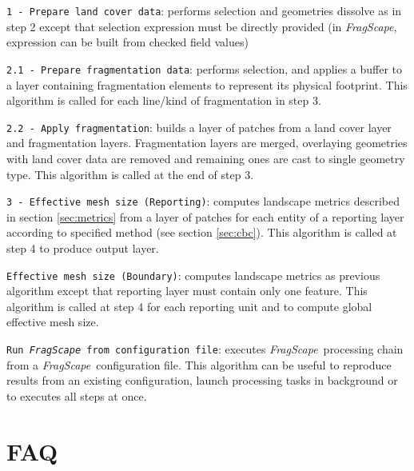\documentclass[11pt]{article}
\newcommand{\tool}{\emph{FragScape}}
\let\tempone\itemize
\let\temptwo\enditemize
\renewenvironment{enumerate}{\tempone\addtolength{\itemsep}{-0.5\baselineskip}}{\temptwo}
\begin{document}
\begin{enumerate}
    \item \texttt{1 - Prepare land cover data}: performs selection and geometries dissolve as in step 2 except that selection expression must be directly provided (in \tool, expression can be built from checked field values)
    \item \texttt{2.1 - Prepare fragmentation data}: performs selection, and applies a buffer to a layer containing fragmentation elements to represent its physical footprint. This algorithm is called for each line/kind of fragmentation in step 3.
    \item \texttt{2.2 - Apply fragmentation}: builds a layer of patches from a land cover layer and fragmentation layers. Fragmentation layers are merged, overlaying geometries with land cover data are removed and remaining ones are cast to single geometry type. This algorithm is called at the end of step 3.
    \item \texttt{3 - Effective mesh size (Reporting)}: computes landscape metrics described in section \ref{sec:metrics} from a layer of patches for each entity of a reporting layer according to specified method (see section \ref{sec:cbc}). This algorithm is called at step 4 to produce output layer.
    \item \texttt{Effective mesh size (Boundary)}: computes landscape metrics as previous algorithm except that reporting layer must contain only one feature. This algorithm is called at step 4 for each reporting unit and to compute global effective mesh size.
    \item \texttt{Run \tool\ from configuration file}: executes \tool\ processing chain from a \tool\ configuration file. This algorithm can be useful to reproduce results from an existing configuration, launch processing tasks in background or to executes all steps at once.  
\end{enumerate}




\section{FAQ}
\end{document}
